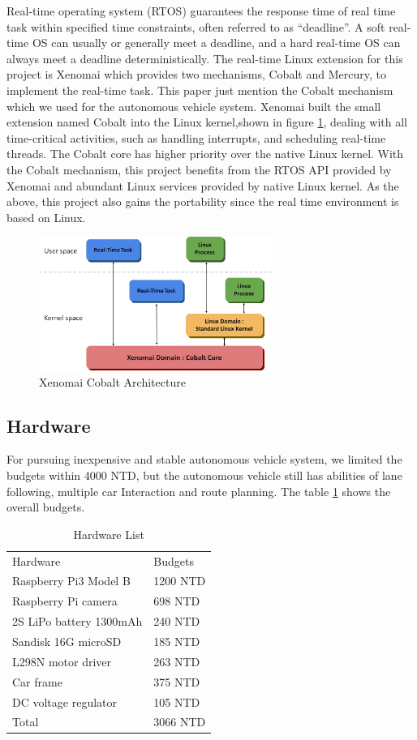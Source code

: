 \documentclass[conference]{IEEEtran}
\begin{document}
Real-time operating system (RTOS) guarantees the response time of real time task within specified time constraints, often referred to as “deadline”. A soft real-time OS can usually or generally meet a deadline, and a hard real-time OS can always meet a deadline deterministically. The real-time Linux extension for this project is Xenomai which provides two mechanisms, Cobalt and Mercury, to implement the real-time task. This paper just mention the Cobalt mechanism which we used for the autonomous vehicle system. Xenomai built the small extension named Cobalt into the Linux kernel,shown in figure \ref{fig:xeno_arch}, dealing with all time-critical activities, such as handling interrupts, and scheduling real-time threads. The Cobalt core has higher priority over the native Linux kernel. With the Cobalt mechanism, this project benefits from the RTOS API provided by Xenomai and abundant Linux services provided by native Linux kernel. As the above, this project also gains the portability since the real time environment is based on Linux.

\begin{figure}
	\centering
	\includegraphics[width=3in]{img/xeno_arch.png}
	\caption{Xenomai Cobalt Architecture}
	\label{fig:xeno_arch}
\end{figure}

\subsection{Hardware}

For pursuing inexpensive and stable autonomous vehicle system, we limited the budgets within 4000 NTD, but the autonomous vehicle still has abilities of lane following, multiple car Interaction and route planning. The table \ref{hardware_list} shows the overall budgets.

\begin{table}
	\centering
	\caption{Hardware List}
	\label{hardware_list}
	\begin{tabular}{ll}
		Hardware                & Budgets  \\
		Raspberry Pi3 Model B   & 1200 NTD \\
		Raspberry Pi camera     & 698 NTD  \\
		2S LiPo battery 1300mAh & 240 NTD  \\
		Sandisk 16G microSD     & 185 NTD  \\
		L298N motor driver      & 263 NTD  \\
		Car frame               & 375 NTD  \\
		DC voltage regulator    & 105 NTD  \\
		Total                   & 3066 NTD
	\end{tabular}
\end{table}
\end{document}
